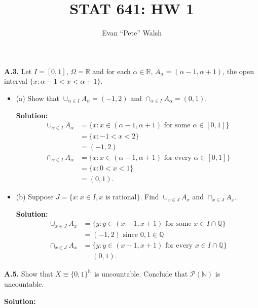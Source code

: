\documentclass[12pt]{article}
\title{STAT 641: HW 1}
\author{Evan ``Pete'' Walsh}
\begin{document}
\maketitle

{\bf A.3.} Let $I = [0,1]$, $\Omega = \mathbb{R}$ and for each $\alpha \in
\mathbb{R}$, $A_{\alpha} = (\alpha-1, \alpha+1)$, the open interval $\{x :
\alpha - 1 < x < \alpha + 1\}$.
\begin{itemize}[label={},leftmargin=4mm, itemsep=1em, parsep=1em]
  \item (a) Show that $\cup_{\alpha\in I}A_{\alpha} = (-1,2)$ and
  $\cap_{\alpha\in I}A_{\alpha} = (0,1)$.

  {\bf Solution:}
  \begin{align*}
    \cup_{\alpha\in I}A_{\alpha} & = \{x : x \in (\alpha-1, \alpha+1) \text{ for
    some } \alpha \in [0,1]\} \\
    & = \{ x : -1 < x < 2 \} \\
    & = (-1, 2) \\
    \cap_{\alpha \in I}A_{\alpha} & = \{ x : x \in (\alpha - 1, \alpha +
    1)\text{ for every } \alpha \in [0,1]\} \\
    & = \{ x : 0 < x < 1\} \\ 
    & = (0,1).
  \end{align*}

  \item (b) Suppose $J = \{x : x \in I, x \text{ is rational}\}$. Find $\cup_{x\in
  J} A_{x}$ and $\cap_{x\in J}A_{x}$.

  {\bf Solution:}
  \begin{align*}
    \cup_{x\in J}A_{x} & = \{y : y \in (x-1,x+1)\text{ for some } x \in I\cap
    \mathbb{Q}\} \\
    & = (-1, 2) \text{ since } 0,1 \in \mathbb{Q} \\
    \cap_{x\in J}A_{x} & = \{y : y \in (x-1, x+1) \text{ for every } x \in I\cap
    \mathbb{Q}\} \\
    & = (0,1).
  \end{align*}
\end{itemize}

{\bf A.5.} Show that $X \equiv \{0,1\}^{\mathbb{N}}$ is uncountable. Conclude
that $\mathcal{P}(\mathbb{N})$ is uncountable.

{\bf Solution:} 
\end{document}
